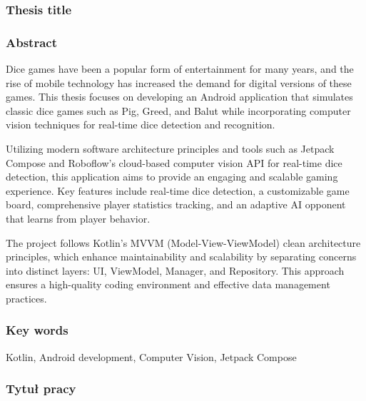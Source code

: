 \subsubsection*{Thesis title}  
\Title

\subsubsection*{Abstract}  
Dice games have been a popular form of entertainment for many years, and the rise of mobile technology has increased the demand for digital versions of these games. This thesis focuses on developing an Android application that simulates classic dice games such as Pig, Greed, and Balut while incorporating computer vision techniques for real-time dice detection and recognition.

Utilizing modern software architecture principles and tools such as Jetpack Compose and Roboflow's cloud-based computer vision API for real-time dice detection, this application aims to provide an engaging and scalable gaming experience. Key features include real-time dice detection, a customizable game board, comprehensive player statistics tracking, and an adaptive AI opponent that learns from player behavior.

The project follows Kotlin's MVVM (Model-View-ViewModel) clean architecture principles, which enhance maintainability and scalability by separating concerns into distinct layers: UI, ViewModel, Manager, and Repository. This approach ensures a high-quality coding environment and effective data management practices.

\subsubsection*{Key words}  
Kotlin, Android development, Computer Vision, Jetpack Compose

\subsubsection*{Tytuł pracy}
\begin{otherlanguage}{polish}
\TitleAlt
\end{otherlanguage}

